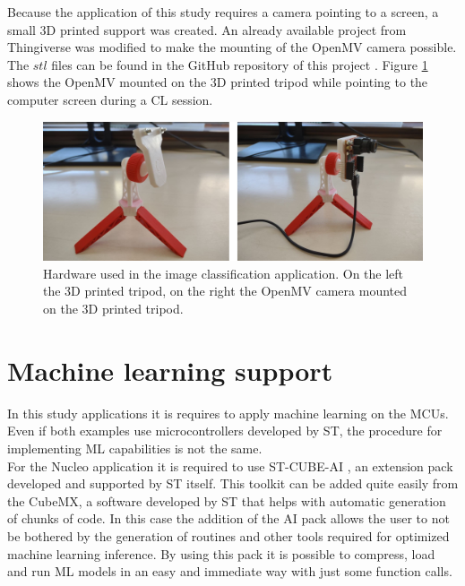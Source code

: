 \documentclass[12pt]{report}
\begin{document}
Because the application of this study requires a camera pointing to a screen, a small 3D printed support was created. An already available project from Thingiverse \autocite{tripod_link} was modified to make the mounting of the OpenMV camera possible. The $stl$ files can be found in the GitHub repository of this project \autocite{github_repo}. Figure \ref{fig:hardware_openmv} shows the OpenMV mounted on the 3D printed tripod while pointing to the computer screen during a CL session.\\

\begin{figure}[h!]
    \centering
    \includegraphics[width=120mm]{Figures/Chapter2/hardware_openmv.jpg} 
    \caption{Hardware used in the image classification application. On the left the 3D printed tripod, on the right the OpenMV camera mounted on the 3D printed tripod.}
    \label{fig:hardware_openmv}    
\end{figure}

\section{Machine learning support}
In this study applications it is requires to apply machine learning on the MCUs. Even if both examples use microcontrollers developed by ST, the procedure for implementing ML capabilities is not the same. \\
For the Nucleo application it is required to use ST-CUBE-AI \autocite{stm_cube_ai}, an extension pack developed and supported by ST itself. This toolkit can be added quite easily from the CubeMX, a software developed by ST that helps with automatic generation of chunks of code. In this case the addition of the AI pack allows the user to not be bothered by the generation of routines and other tools required for optimized machine learning inference. By using this pack it is possible to compress, load and run ML models in an easy and immediate way with just some function calls.
\end{document}
